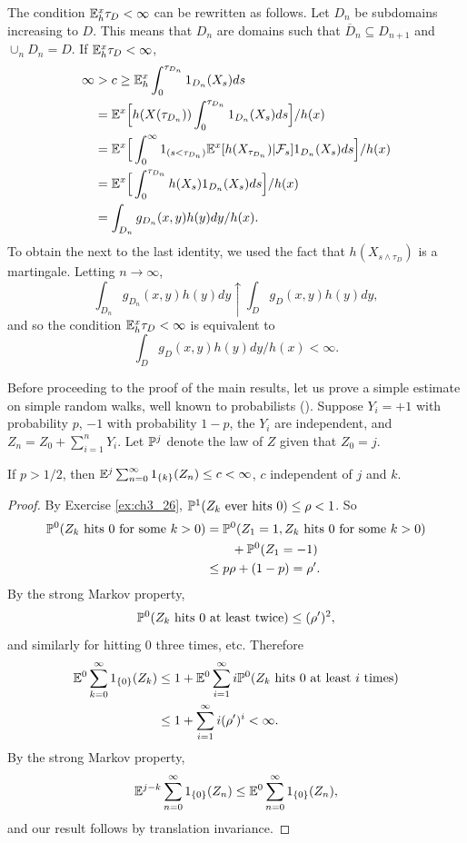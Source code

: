 The condition $\E_h^x\tau_D < \infty$ can be rewritten as follows. Let $D_n$ be subdomains increasing to $D$. This means that $D_n$ are domains such that $\overline{D}_n \subseteq D_{n+1}$ and $\cup_nD_n = D$. If $\E_h^x\tau_D < \infty$,
\begin{align*}
    \infty &> c \geq \E_h^x \int_0^{\tau_{D_n}} 1_{D_n}(X_s)ds \\
    &= \E^x\Big[h(X(\tau_{D_n})) \int_0^{\tau_{D_n}} 1_{D_n}(X_s)ds\Big]/h(x) \\
    &= \E^x\Big[\int_0^\infty 1_{(s<\tau_{D_n})}\E^x[h(X_{\tau_{D_n}})|\FC_s]1_{D_n}(X_s)ds\Big]/h(x) \\
    &= \E^x\Big[\int_0^{\tau_{D_n}} h(X_s)1_{D_n}(X_s)ds\Big]/h(x) \\
    &= \int_{D_n} g_{D_n}(x,y)h(y)dy/h(x).
\end{align*}
\mnewpage
To obtain the next to the last identity, we used the fact that $h(X_{s\wedge\tau_D})$ is a martingale. Letting $n \to \infty$,
\[
    \int_{D_n} g_{D_n}(x,y)h(y)dy \uparrow \int_D g_D(x,y)h(y)dy,
\]
and so the condition $\E_h^x\tau_D < \infty$ is equivalent to
\[
    \int_D g_D(x,y)h(y)dy/h(x) < \infty.
\]

Before proceeding to the proof of the main results, let us prove a simple estimate on simple random walks, well known to probabilists (\cite{Feller1968}). Suppose $Y_i = +1$ with probability $p$, $-1$ with probability $1-p$, the $Y_i$ are independent, and $Z_n = Z_0 + \sum_{i=1}^n Y_i$. Let $\P^j$ denote the law of $Z$ given that $Z_0 = j$.

\begin{proposition}\label{prop:ch3_3.1}
If $p > 1/2$, then $\E^j \sum_{n=0}^\infty 1_{\{k\}}(Z_n) \leq c < \infty$, $c$ independent of $j$ and $k$.
\end{proposition}

\begin{proof}
By Exercise \ref{ex:ch3_26}, $\P^1(Z_k~\text{ever hits}~0) \leq \rho < 1$. So
\begin{align*}
    \P^0(Z_k~\text{hits}~0~\text{for some}~k > 0) &= \P^0(Z_1 = 1, Z_k~\text{hits}~0~\text{for some}~k > 0) \\
    &\qquad + \P^0(Z_1 = -1) \\
    &\leq p\rho + (1-p) = \rho'.
\end{align*}
By the strong Markov property,
\[
    \P^0(Z_k~\text{hits}~0~\text{at least twice}) \leq (\rho')^2,
\]
and similarly for hitting $0$ three times, etc. Therefore
\begin{align*}
    \E^0 \sum_{k=0}^\infty 1_{\{0\}}(Z_k) &\leq 1 + \E^0 \sum_{i=1}^\infty i\P^0(Z_k~\text{hits}~0~\text{at least}~i~\text{times}) \\
    &\leq 1 + \sum_{i=1}^\infty i(\rho')^i < \infty.
\end{align*}
By the strong Markov property,
\[
    \E^{j-k} \sum_{n=0}^\infty 1_{\{0\}}(Z_n) \leq \E^0 \sum_{n=0}^\infty 1_{\{0\}}(Z_n),
\]
and our result follows by translation invariance.
\end{proof}

